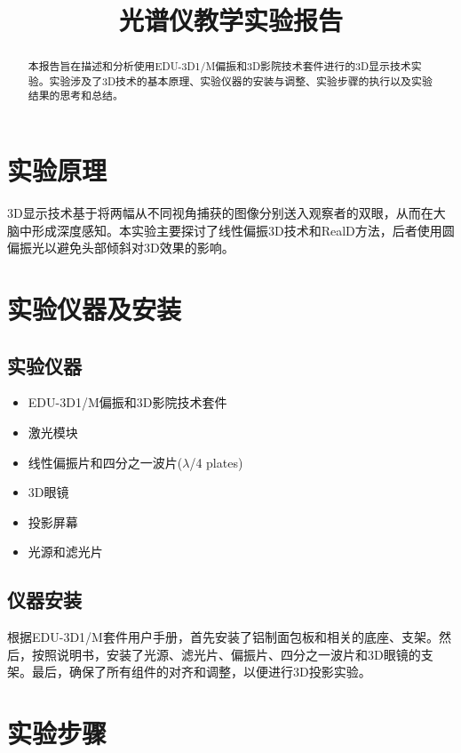\documentclass{ctexart}
\title{光谱仪教学实验报告}
\begin{document}
\maketitle

\begin{abstract}
本报告旨在描述和分析使用EDU-3D1/M偏振和3D影院技术套件进行的3D显示技术实验。实验涉及了3D技术的基本原理、实验仪器的安装与调整、实验步骤的执行以及实验结果的思考和总结。
\end{abstract}

\section{实验原理}
3D显示技术基于将两幅从不同视角捕获的图像分别送入观察者的双眼，从而在大脑中形成深度感知。本实验主要探讨了线性偏振3D技术和RealD方法，后者使用圆偏振光以避免头部倾斜对3D效果的影响。

\section{实验仪器及安装}
\subsection{实验仪器}
\begin{itemize}
    \item EDU-3D1/M偏振和3D影院技术套件
    \item 激光模块
    \item 线性偏振片和四分之一波片($\lambda$/4 plates)
    \item 3D眼镜
    \item 投影屏幕
    \item 光源和滤光片
\end{itemize}
\subsection{仪器安装}
根据EDU-3D1/M套件用户手册，首先安装了铝制面包板和相关的底座、支架。然后，按照说明书，安装了光源、滤光片、偏振片、四分之一波片和3D眼镜的支架。最后，确保了所有组件的对齐和调整，以便进行3D投影实验。

\section{实验步骤}
\end{document}

